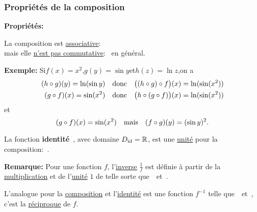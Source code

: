 \begin{frame}[plain]
\frametitle{\bf Propri\'et\'es de la composition}
\medskip 

{\bf Propri\'et\'es:}
\begin{itemize}
\bitem 
La composition est \underline{associative}:\ 
 \\ 
mais elle \underline{n'est pas commutative}:\ 
 en g\'en\'eral. 
\end{itemize}

\pause
{\small 
{\bf Exemple:}\quad
Si\quad $f(x)=x^2$,\quad $g(y)=\sin y$\quad et\quad $h(z)=\ln z$,\quad on a
\begin{align*}
(h\circ g)(y) = \ln(\sin y) & \quad\mbox{donc}\quad 
\big((h\circ g) \circ f\big)(x) = \ln(\sin(x^2)) \\ 
(g\circ f)(x) = \sin(x^2) & \quad\mbox{donc}\quad 
\big(h\circ (g\circ f)\big)(x) = \ln(\sin(x^2))
\vspace*{-2mm}
\end{align*}
et 
\vspace*{-2mm}
$$
(g\circ f)(x) = \sin(x^2) \quad\mbox{mais}\quad 
(f\circ g)(y) = (\sin y)^2.
\vspace*{-2mm}
$$
}

\pause
\begin{itemize}
\bitem 
La fonction {\bf identit\'e}\ , avec domaine 
$D_{\mathrm{id}}=\mathbb R$, est une \underline{unit\'e} pour la composition:\ 
. 
\end{itemize}
\vspace*{0.5mm}

\pause
{\small 
{\bf Remarque:}\quad
Pour une fonction $f$, l'\underline{inverse} $\displaystyle\frac{1}{f}$ est d\'efinie 
\`a partir de la \underline{multiplication} et de l'\underline{unit\'e} $1$ 
de telle sorte que\ \ et\
. 

L'analogue pour la \underline{composition} et l'\underline{identit\'e} 
est une fonction $f^{-1}$ telle que\ \ et\
, c'est la \underline{r\'eciproque} de $f$. 
} 

\end{frame}



